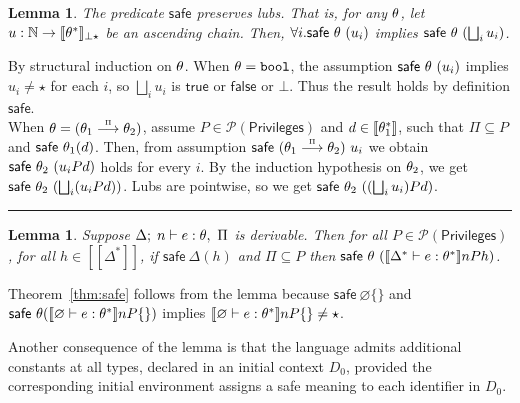 \documentclass[submission,copyright,creativecommons]{eptcs}
\newcommand{\blackslug}{\rule{7pt}{7pt}}
\newcommand{\BOOL}{\mbox{\texttt{bool}}}
\renewcommand{\P}{\mathcal{P}}
\newcommand{\ldb}{[\![}
\newcommand{\rdb}{]\!]}
\newcommand{\means}[1]{\ldb {#1}\rdb}
\newcommand{\proves}{\vdash}
\newcommand{\Empty}{\varnothing}
\def\lpields#1{\stackrel{#1}{\longrightarrow}}
\newcommand{\annoto}[1]{\lpields {\scriptscriptstyle #1}}
\newcommand{\Lub}{\bigsqcup}
\newcommand{\nats}{{\mathbb{N}}}
\newcommand{\PRIV}{{\mathsf{Privileges}}}
\newcommand{\safe}{\textsf{safe}}
\newcommand{\n}{n} \newcommand{\p}{p} \newcommand{\Ps}{\Pi} \newcommand{\h}{h}
\newtheorem{lemma}[theorem]{Lemma}
\newenvironment{proof}{\begin{trivlist}\item[\hskip\labelsep{\bf
Proof:}]}{\blackslug\end{trivlist}}
\begin{document}
\begin{lemma}
\label{lem:adm}
The predicate $\safe$ preserves lubs. That is, for any $\theta$,
let $u:\nats\to\means{\th^*}_{\bot\star}$ be an ascending chain. Then,
$\forall i.\safe~\th~(u_i)$ implies $\safe~\th~(\Lub_{i}u_i)$.

\end{lemma}
\begin{proof}
By structural induction on $\theta$. When $\th=\BOOL$, 
the assumption $\safe~\th~(u_i)$ implies $u_i\neq\star$ for each $i$, 
so $\Lub_{i}u_i$ is 
$\mathsf{true}$ or $\mathsf{false}$ or $\bot$.  Thus the result holds by definition 
$\safe$. \\
When $\th=(\th_1\annoto{\Ps}\th_2)$, assume $P\in\P(\PRIV)$ and 
$d\in\means{\th_1^*}$, such that $\Ps\subseteq P$ and 
$\safe~\th_{1}(d)$. Then, from assumption $\safe~(\th_1\annoto{\Ps}\th_2)~u_i$
we obtain $\safe~\th_2~(u_{i} P d)$ holds for every $i$. By the induction 
hypothesis on $\theta_2$, we get $\safe~\th_2~(\Lub_{i}(u_{i} P d))$. 
Lubs are pointwise, so we get $\safe~\th_2~((\Lub_{i}u_{i}) P d)$.
\end{proof}
\begin{lemma}
\label{lem:safe}
Suppose $\Delta;\;\n\proves e:\th,~\Ps$ is derivable.
Then for all $P\in\P(\PRIV)$, for all $\h\in\means{\Delta^*}$, if $\safe~ {\Delta}(\h)$
and $\Ps\subseteq P$ then  
$\safe~\th~(\means{\Delta^*\proves e:\th^*}\n P \h) $.
\end{lemma}

\begin{sloppypar}
Theorem~\ref{thm:safe} follows from the lemma because 
$\safe~ {\Empty} \{\}$ and  
$\safe~ {\th} (\means{\Empty\proves e:\th^*}\n P \{\}) $ 
implies 
$\means{\Empty\proves e:\th^*}\n P \{\} \neq \star$.
\end{sloppypar}

Another consequence of the lemma is that the language admits
additional constants at all types, declared in an initial context
$D_0$, provided the corresponding initial environment assigns a safe
meaning to each identifier in $D_0$.
\end{document}
